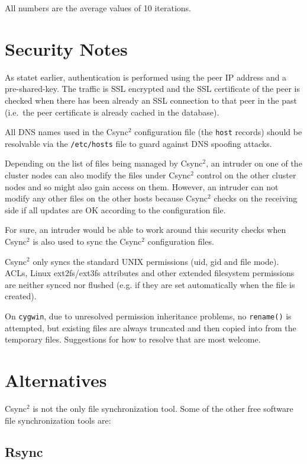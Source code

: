 \documentclass[a4paper,twocolumn]{article}
\def\csync2{{\sc Csync$^{2}$}}
\begin{document}
All numbers are the average values of 10 iterations.

\section{Security Notes}

As statet earlier, authentication is performed using the peer IP address and a
pre-shared-key. The traffic is SSL encrypted and the SSL certificate of the
peer is checked when there has been already an SSL connection to that peer in
the past (i.e.~the peer certificate is already cached in the database).

All DNS names used in the \csync2 configuration file (the {\tt host} records)
should be resolvable via the {\tt /etc/hosts} file to guard against DNS
spoofing attacks.

Depending on the list of files being managed by \csync2, an intruder on one of
the cluster nodes can also modify the files under \csync2 control on the other
cluster nodes and so might also gain access on them. However, an intruder can
not modify any other files on the other hosts because \csync2 checks on the
receiving side if all updates are OK according to the configuration file.

For sure, an intruder would be able to work around this security checks when
\csync2 is also used to sync the \csync2 configuration files.

\csync2 only syncs the standard UNIX permissions (uid, gid and file mode).
ACLs, Linux ext2fs/ext3fs attributes and other extended filesystem permissions
are neither synced nor flushed (e.g. if they are set automatically when
the file is created).

On {\tt cygwin}, due to unresolved permission inheritance problems,
no {\tt rename()} is attempted, but existing files are always truncated
and then copied into from the temporary files.
Suggestions for how to resolve that are most welcome.

\section{Alternatives}

\csync2 is not the only file synchronization tool. Some of the other
free software file synchronization tools are:

\subsection{Rsync}
\end{document}
